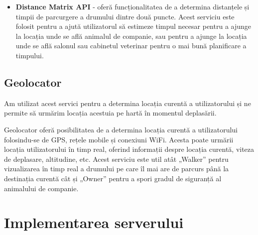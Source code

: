 \begin{itemize}
    \item \textbf{Distance Matrix API} - oferă funcționalitatea de a determina distanțele și timpii de parcurgere a drumului dintre două puncte. Acest serviciu este folosit pentru a ajută utilizatorul să estimeze timpul necesar pentru a ajunge la locația unde se află animalul de companie, sau pentru a ajunge la locația unde se află salonul sau cabinetul veterinar pentru o mai bună planificare a timpului.
\end{itemize}

\subsection{Geolocator}

Am utilizat acest servici pentru a determina locația curentă a utilizatorului și ne permite să urmărim locația acestuia pe hartă în momentul deplasării. 

Geolocator oferă posibilitatea de a determina locația curentă a utilizatorului folosindu-se de GPS, rețele mobile și conexiuni WiFi. Acesta poate urmării locația utilizatorului în timp real, oferind informații despre locația curentă, viteza de deplasare, altitudine, etc. Acest serviciu este util atât „Walker” pentru vizualizarea în timp real a drumului pe care îl mai are de parcurs până la destinația curentă cât și „Owner” pentru a spori gradul de siguranță al animalului de companie.

\section{Implementarea serverului}

